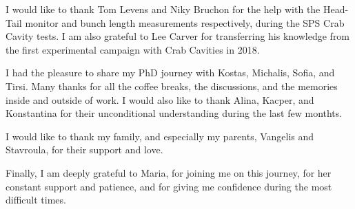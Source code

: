 I would like to thank Tom Levens and Niky Bruchon for the help with the Head-Tail monitor and bunch length measurements respectively, during the SPS Crab Cavity tests. I am also grateful to Lee Carver for transferring his knowledge from the first experimental campaign with Crab Cavities in 2018.

I had the pleasure to share my PhD journey with Kostas, Michalis, Sofia, and Tirsi. Many thanks for all the coffee breaks, the discussions, and the memories inside and outside of work. I would also like to thank Alina, Kacper, and Konstantina for their unconditional understanding during the last few monthts. 

I would like to thank my family, and especially my parents, Vangelis and Stavroula, for their support and love.

Finally, I am deeply grateful to Maria, for joining me on this journey, for her constant support and patience, and for giving me confidence during the most difficult times. 